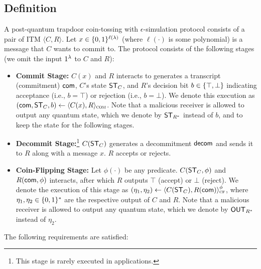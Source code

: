 \subsection{Definition}
\label{sec:com-n-prove:def}

\begin{definition}
\label{def:com-n-prove}
A post-quantum trapdoor coin-tossing with $\epsilon$-simulation protocol consists of a pair of \PPT ITM $\langle C, R \rangle$. Let $x\in \{0,1\}^{\ell(\lambda)}$ (where $\ell(\cdot)$ is some polynomial) is a message that $C$ wants to commit to. The protocol consists of the following stages (we omit the input $1^\lambda$ to $C$ and $R$): 
\begin{itemize}
\item 
{\bf Commit Stage:} 
$C(x)$ and $R$ interacts to generates a transcript (commitment) $\mathsf{com}$, 
$C$'s state $\mathsf{ST}_C$, and $R$'s decision bit $b\in \{\top, \bot\}$ indicating acceptance (i.e., $b=\top$) or rejection (i.e., $b=\bot$). We denote this execution as $(\mathsf{com}, \mathsf{ST}_C, b) \gets \langle C(x), R \rangle_\textsc{com}$. 
Note that a malicious receiver is allowed to output any quantum state, which we denote by $\mathsf{ST}_{R^*}$ instead of $b$, and to keep the state for the following stages. 


\item 
{\bf Decommit Stage:}\footnote{This stage is rarely executed in applications.} $C(\mathsf{ST}_C)$ generates a decommitment $\mathsf{decom}$ and sends it to $R$ along with a message $x$. $R$ accepts or rejects. 

\item 
{\bf Coin-Flipping Stage:} 
Let $\phi(\cdot)$ be any predicate. $C(\mathsf{ST}_C, \phi)$ and $R(\mathsf{com},\phi)$ interacts, after which $R$ outputs $\top$ (accept) or $\bot$ (reject). We denote the execution of this stage as $(\eta_1, \eta_2) \gets \langle C(\mathsf{ST}_C), R(\mathsf{com}) \rangle^\phi_\textsc{cf}$, where $\eta_1, \eta_2 \in \{0,1\}^*$ are the respective output of $C$ and $R$. Note that a malicious receiver is allowed to output any quantum state, which we denote by $\mathsf{OUT}_{R^*}$ instead of $\eta_2$. 

\end{itemize}
The following requirements are satisfied:
\end{definition}
